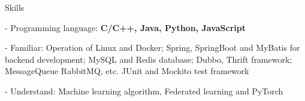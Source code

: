 \documentclass{resume} %
\begin{document}
\begin{rSection}{Skills}
    \begin{rSubsection}
    {}{}{}{}
        \item[-] Programming language: \textbf{C/C++, Java, Python, JavaScript}
        \item[-] Familiar: Operation of Linux and Docker; Spring, SpringBoot and MyBatis for backend development; MySQL and Redis database; Dubbo, Thrift framework; MessageQueue RabbitMQ, etc. JUnit and Mockito test framework
        \item[-] Understand: Machine learning algorithm, Federated learning and PyTorch
    \end{rSubsection}
\end{rSection}
    
\end{document}
